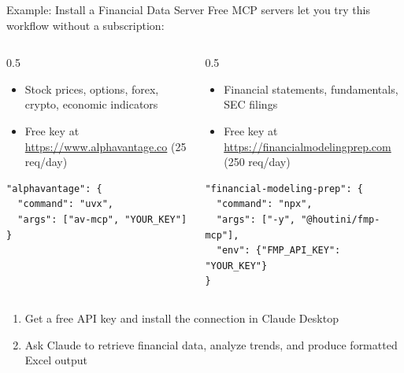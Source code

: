 \documentclass[aspectratio=169]{beamer}
\begin{document}
\begin{frame}[fragile,shrink=5]{Example: Install a Financial Data Server}
Free MCP servers let you try this workflow without a subscription:
\vspace{0.2cm}
\begin{columns}[T]
\begin{column}{0.5\textwidth}
\begin{shadedbox}[title=\textbf{Alpha Vantage}]
\begin{itemize}\scriptsize
  \item Stock prices, options, forex, crypto, economic indicators
  \item Free key at \url{https://www.alphavantage.co} (25 req/day)
\end{itemize}
\vspace{0.1cm}
\begin{verbatim}
"alphavantage": {
  "command": "uvx",
  "args": ["av-mcp", "YOUR_KEY"]
}
\end{verbatim}
\end{shadedbox}
\end{column}
\begin{column}{0.5\textwidth}
\begin{shadedbox}[title=\textbf{Financial Modeling Prep}]
\begin{itemize}\scriptsize
  \item Financial statements, fundamentals, SEC filings
  \item Free key at \url{https://financialmodelingprep.com} (250 req/day)
\end{itemize}
\vspace{0.1cm}
\begin{verbatim}
"financial-modeling-prep": {
  "command": "npx",
  "args": ["-y", "@houtini/fmp-mcp"],
  "env": {"FMP_API_KEY": "YOUR_KEY"}
}
\end{verbatim}
\end{shadedbox}
\end{column}
\end{columns}
\vspace{0.2cm}
\begin{enumerate}\small
  \item Get a free API key and install the connection in Claude Desktop
  \item Ask Claude to retrieve financial data, analyze trends, and produce formatted Excel output
\end{enumerate}
\end{frame}
\end{document}
